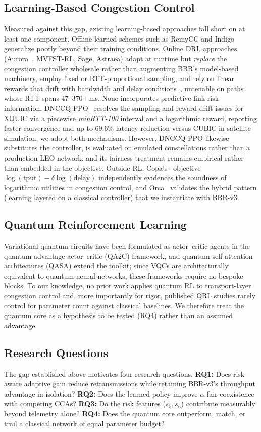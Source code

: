 \documentclass[journal]{IEEEtran}
\begin{document}
\subsection{Learning-Based Congestion Control}
Measured against this gap, existing learning-based approaches fall short on
at least one component. Offline-learned schemes such as RemyCC and Indigo
generalize poorly beyond their training conditions. Online DRL
approaches (Aurora~\cite{aurora}, MVFST-RL, Sage, Astraea) adapt at
runtime but \emph{replace} the congestion controller wholesale rather than
augmenting BBR's model-based machinery, employ fixed or RTT-proportional
sampling, and rely on linear rewards that drift with bandwidth and delay
conditions~\cite{yu2026dnccq}, untenable on paths whose RTT spans
47--370+\,ms. None incorporates predictive link-risk information.
DNCCQ-PPO~\cite{yu2026dnccq} resolves the sampling and reward-drift issues
for XQUIC via a piecewise \emph{minRTT-100} interval and a logarithmic
reward, reporting faster convergence and up to 69.6\% latency reduction
versus CUBIC in satellite simulation; we adopt both mechanisms. However,
DNCCQ-PPO likewise substitutes the controller, is evaluated on emulated
constellations rather than a production LEO network, and its fairness
treatment remains empirical rather than embedded in the objective. Outside
RL, Copa's~\cite{copa} objective
$\log(\mathrm{tput})-\delta\log(\mathrm{delay})$ independently evidences the
soundness of logarithmic utilities in congestion control, and
Orca~\cite{orca} validates the hybrid pattern (learning layered on a
classical controller) that we instantiate with BBR-v3.

\subsection{Quantum Reinforcement Learning}
Variational quantum circuits have been formulated as actor--critic agents in
the quantum advantage actor--critic (QA2C) framework, and
quantum self-attention architectures (QASA) extend the toolkit; since VQCs
are architecturally equivalent to quantum neural networks, these frameworks
require no bespoke blocks. To our knowledge, no prior work applies quantum
RL to transport-layer congestion control and, more importantly for
rigor, published QRL studies rarely control for parameter count against
classical baselines. We therefore treat the quantum core as a hypothesis to
be tested (RQ4) rather than an assumed advantage.

\subsection{Research Questions}
\label{sec:rq}
The gap established above motivates four research questions.
\textbf{RQ1:} Does risk-aware adaptive gain reduce retransmissions while
retaining BBR-v3's throughput advantage in isolation?
\textbf{RQ2:} Does the learned policy improve $\alpha$-fair coexistence with
competing CCAs?
\textbf{RQ3:} Do the risk features ($s_5,s_6$) contribute measurably beyond
telemetry alone?
\textbf{RQ4:} Does the quantum core outperform, match, or trail a
classical network of equal parameter budget?
\end{document}
